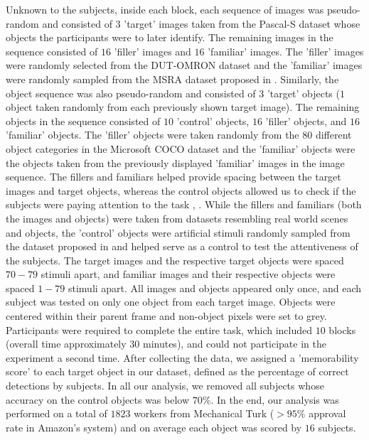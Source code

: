 Unknown to the subjects, inside each block, each sequence of images was pseudo-random and consisted of $3$ 'target' images taken from the Pascal-S dataset whose objects the participants were to later identify. The remaining images in the sequence consisted of $16$ 'filler' images and $16$ 'familiar' images. The 'filler' images were randomly selected from the DUT-OMRON dataset \cite{dutomron13} and the 'familiar' images were randomly sampled from the MSRA dataset proposed in \cite{msra11}. Similarly, the object sequence was also pseudo-random and consisted of $3$ 'target' objects ($1$ object taken randomly from each previously shown target image). The remaining objects in the sequence consisted of $10$ 'control' objects, $16$ 'filler' objects, and $16$ 'familiar' objects. The 'filler' objects were taken randomly from the $80$ different object categories in the Microsoft COCO dataset \cite{coco14} and the 'familiar' objects were the objects taken from the previously displayed 'familiar' images in the image sequence. The fillers and familiars helped provide spacing between the target images and target objects, whereas the control objects allowed us to check if the subjects were paying attention to the task \cite{brady08}, \cite{isola11}. While the fillers and familiars (both the images and objects) were taken from datasets resembling real world scenes and objects, the 'control' objects were artificial stimuli randomly sampled from the dataset proposed in \cite{brady08} and helped serve as a control to test the attentiveness of the subjects. The target images and the respective target objects were spaced $70-79$ stimuli apart, and familiar images and their respective objects were spaced $1-79$ stimuli apart. All images and objects appeared only once, and each subject was tested on only one object from each target image. Objects were centered within their parent frame and non-object pixels were set to grey. Participants were required to complete the entire task, which included $10$ blocks (overall time approximately $30$ minutes), and could not participate in the experiment a second time. After collecting the data, we assigned a 'memorability score' to each target object in our dataset, defined as the percentage of correct detections by subjects. In all our analysis, we removed all subjects whose accuracy on the control objects was below $70\%$. In the end, our analysis was performed on a total of {$1823$} workers from Mechanical Turk ($> 95\%$ approval rate in Amazon’s system) and on average each object was scored by $16$ subjects. 
